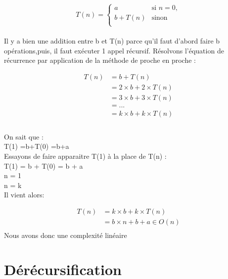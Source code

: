 \documentclass[a4paper, 11pt, oneside]{article}
\begin{document}
\begin{equation*}
T(n) =
\begin{cases}
a & \text{si } n = 0,\\
b + T(n) & \text{sinon } \\

\end{cases}
\end{equation*}
\\

Il y a bien une addition entre b et T(n) parce qu’il faut d’abord faire b opérations,puis, il faut exécuter 1 appel récursif. Résolvons l’équation de récurrence par application de la méthode de proche en proche :


\begin{align}
T(n) & = b + T(n) \\
& = 2 \times b + 2 \times T(n) \\
& = 3 \times b + 3 \times T(n) \\
& = ... \\
& = k \times b + k \times T(n) \\
\end{align}
\\
On sait que : \\
 T(1) =b+T(0) =b+a \\

 Essayons de faire apparaitre T(1) à la place de T(n) :\\
 T(1) = b + T(0) = b + a \\
 n = 1 \\
 n = k \\
 \newpage
 Il vient alors:

\begin{align}
T(n) & = k \times b + k \times T(n)\\
& = b \times n + b + a  \in O(n)\\
\end{align}
Nous avons donc une complexité linéaire












\section{Dérécursification}\label{derecur}
%
%
\end{document}
